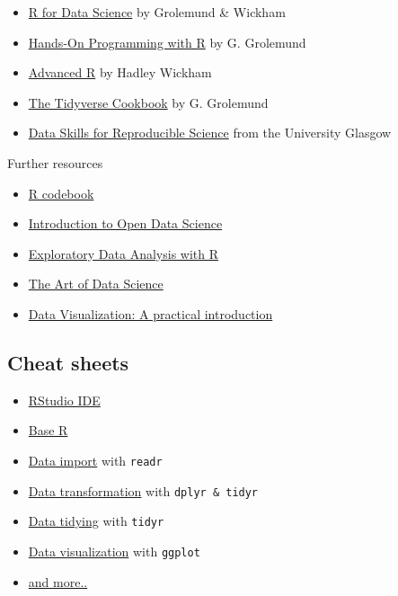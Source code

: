 \documentclass[
]{scrartcl}
\providecommand{\tightlist}{%
  \setlength{\itemsep}{0pt}\setlength{\parskip}{0pt}}
\begin{document}
\begin{itemize}
\tightlist
\item
  \href{https://r4ds.had.co.nz/}{R for Data Science} by Grolemund \& Wickham
\item
  \href{https://rstudio-education.github.io/hopr/}{Hands-On Programming with R} by G. Grolemund
\item
  \href{https://adv-r.hadley.nz/}{Advanced R} by Hadley Wickham
\item
  \href{https://rstudio-education.github.io/tidyverse-cookbook}{The Tidyverse Cookbook} by G. Grolemund
\item
  \href{https://psyteachr.github.io/reprores-v3/index.html}{Data Skills for Reproducible Science} from the University Glasgow
\end{itemize}

Further resources

\begin{itemize}
\tightlist
\item
  \href{http://www.cookbook-r.com/}{R codebook}
\item
  \href{http://ohi-science.org/data-science-training/}{Introduction to Open Data Science}
\item
  \href{https://bookdown.org/rdpeng/exdata/}{Exploratory Data Analysis with R}
\item
  \href{https://bookdown.org/rdpeng/artofdatascience/}{The Art of Data Science}
\item
  \href{http://socviz.co/}{Data Visualization: A practical introduction}
\end{itemize}

\subsection{Cheat sheets}\label{cheatsheets}

\begin{itemize}
\tightlist
\item
  \href{https://raw.githubusercontent.com/rstudio/cheatsheets/main/rstudio-ide.pdf}{RStudio IDE}
\item
  \href{https://raw.githubusercontent.com/rstudio/cheatsheets/master/base-r.pdf}{Base R}
\item
  \href{https://raw.githubusercontent.com/rstudio/cheatsheets/main/data-import.pdf}{Data import} with \texttt{readr}
\item
  \href{https://raw.githubusercontent.com/rstudio/cheatsheets/main/data-transformation.pdf}{Data transformation} with \texttt{dplyr\ \&\ tidyr}
\item
  \href{https://raw.githubusercontent.com/rstudio/cheatsheets/master/tidyr.pdf}{Data tidying} with \texttt{tidyr}
\item
  \href{https://raw.githubusercontent.com/rstudio/cheatsheets/main/data-visualization.pdf}{Data visualization} with \texttt{ggplot}
\item
  \href{https://rstudio.com/resources/cheatsheets/}{and more..}
\end{itemize}
\end{document}
